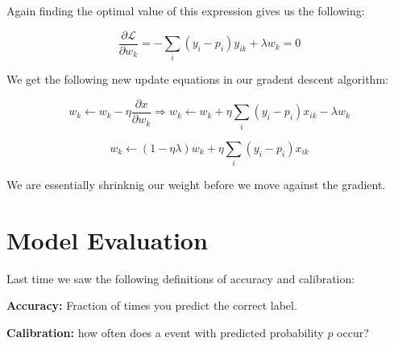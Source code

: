 Again finding the optimal value of this expression gives us the following:  

$$
\frac{ \partial \mathcal{L}}{\partial w_k} = - \sum_i (y_i - p_i)y_{ik} +\lambda w_{k} = 0
$$

We get the following new update equations in our gradent descent algorithm: 

$$
w_k \leftarrow w_k - \eta \frac{\partial x}{\partial w_k} \Rightarrow
w_k \leftarrow w_k + \eta \sum_i (y_i - p_i)x_{ik} - \lambda w_k
$$

\begin{equation}
w_k \leftarrow (1 - \eta \lambda) w_k + \eta \sum_i (y_i - p_i)x_{ik}
\end{equation}

We are essentially shrinknig our weight before we move against the gradient.  


\section{ Model Evaluation}

Last time we saw the following definitions of accuracy and calibration: 

\textbf{Accuracy: } Fraction of times you predict the correct label.

\textbf{Calibration: } how often does a event with predicted probability $p$ occur?  




























